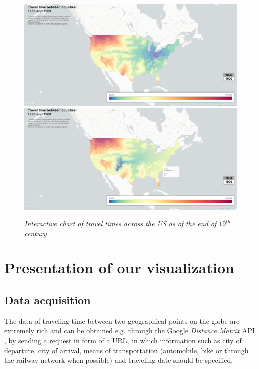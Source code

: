 \documentclass{vgtc}                          %
\begin{document}
\begin{figure}[!h]
 \centering %
 \includegraphics[scale=1, width=\columnwidth]{CarteInteractiveUSA.png}
 \includegraphics[scale=1, width=\columnwidth]{CarteInteractiveUSA_2.png}
 \caption{\textit{Interactive chart of travel times across the US as of the end of $19^{th}$ century } \cite{Moser} }
 \label{fig:sample}
\end{figure}


\section{Presentation of our visualization}

\vspace{0.1cm}

\subsection{Data acquisition}

\vspace{0.2cm}

The data of traveling time between two geographical points on the globe are extremely rich and can be obtained e.g. through the Google \textit{Distance Matrix} API \cite{APIGoogle},
by sending a request in form of a URL, in which information such as city of departure, city of arrival, means of transportation (automobile, bike or through the railway network when possible) and traveling date should be specified.  
  
\end{document}
